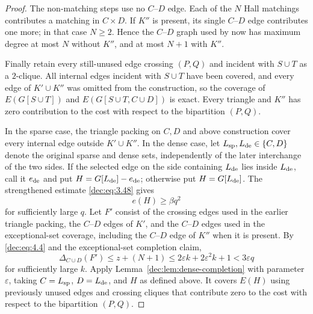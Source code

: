 \documentclass[11pt]{article}
\numberwithin{equation}{section}
\theoremstyle{remark}
\newcommand{\e}{\varepsilon}
\begin{document}
\begin{proof}
The non-matching steps use no \(C\)--\(D\) edge.  Each of the \(N\)
Hall matchings contributes a matching in \(C\times D\).  If \(K''\) is
present, its single \(C\)--\(D\) edge contributes one more; in that case
\(N\ge2\).  Hence the \(C\)--\(D\) graph used by now has maximum
degree at most \(N\) without \(K''\), and at most \(N+1\) with \(K''\).

Finally retain every still-unused edge crossing \((P,Q)\) and incident with
\(S\cup T\) as a \(2\)-clique.  All internal edges incident with
\(S\cup T\) have been covered, and every edge of \(K'\cup K''\) was
omitted from the construction, so the coverage of \(E(G[S\cup T])\) and \(E(G[S\cup T, C\cup D])\) is
exact. Every triangle and \(K''\) has zero contribution to the cost with respect to the bipartition \((P,Q)\).

In the sparse case, the triangle packing on \(C,D\) and above construction cover every
internal edge outside \(K'\cup K''\). In the dense case, let
\(L_{\rm sp},L_{\rm de}\in\{C,D\}\) denote the original sparse and dense
sets, independently of the later interchange of the two sides.  If
the selected edge on the side containing \(L_{\rm de}\)
lies inside \(L_{\rm de}\), call it \(e_{\rm de}\) and put
\(H=G[L_{\rm de}]-e_{\rm de}\); otherwise put \(H=G[L_{\rm de}]\).
The strengthened estimate \eqref{dec:eq:3.48} gives
\begin{equation*}
 e(H)\ge\beta q^2
\end{equation*}
for sufficiently large \(q\).  Let \(F'\) consist of the crossing edges used in the earlier triangle packing,
the \(C\)--\(D\) edges of \(K'\), and the \(C\)--\(D\) edges used in the
exceptional-set coverage, including the \(C\)--\(D\) edge of \(K''\) when it is
present. By \eqref{dec:eq:4.4} and the exceptional-set completion claim,
\begin{equation*}
 \Delta_{C\cup D}(F')
 \le z+(N+1)
 \le2\e k+2\e^2k+1
 <3\e q
\end{equation*}
for sufficiently large \(k\). Apply Lemma~\ref{dec:lem:dense-completion} with parameter \(\e\), taking
\(C=L_{\rm sp}\), \(D=L_{\rm de}\), and \(H\) as defined above. It covers
\(E(H)\) using previously unused edges and crossing cliques that contribute
zero to the cost with respect to the bipartition \((P,Q)\).


\end{proof}
\end{document}
